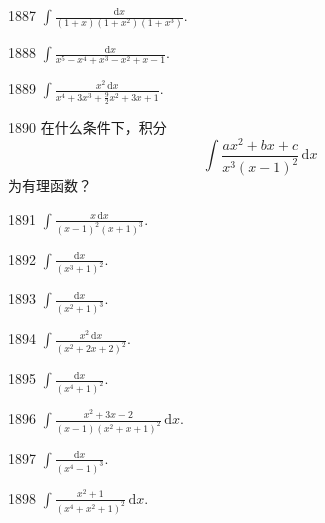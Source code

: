 \begin{prob}[S]{1887}
$\int \frac{\mathrm{d}x}{(1 + x)(1 + x^2)(1 + x^3)}$.
\end{prob}

\begin{prob}[S]{1888}
$\int \frac{\mathrm{d}x}{x^5 - x^4 + x^3 - x^2 + x - 1}$.
\end{prob}

\begin{prob}[S]{1889}
$\int \frac{x^2\,\mathrm{d}x}{x^4 + 3x^3 + \frac{9}{2}x^2 + 3x + 1}$.
\end{prob}

\begin{prob}[M]{1890}
在什么条件下，积分
\[
\int \frac{ax^2 + bx + c}{x^3(x - 1)^2}\,\mathrm{d}x
\]
为有理函数？
\end{prob}


\begin{prob}[S]{1891}
$\displaystyle \int \frac{x\,\mathrm{d}x}{(x - 1)^2(x + 1)^3}$.
\end{prob}

\begin{prob}[S]{1892}
$\displaystyle \int \frac{\mathrm{d}x}{(x^3 + 1)^2}$.
\end{prob}

\begin{prob}[S]{1893}
$\displaystyle \int \frac{\mathrm{d}x}{(x^2 + 1)^3}$.
\end{prob}

\begin{prob}[S]{1894}
$\displaystyle \int \frac{x^2\,\mathrm{d}x}{(x^2 + 2x + 2)^2}$.
\end{prob}

\begin{prob}[S]{1895}
$\displaystyle \int \frac{\mathrm{d}x}{(x^4 + 1)^2}$.
\end{prob}

\begin{prob}[S]{1896}
$\displaystyle \int \frac{x^2 + 3x - 2}{(x - 1)(x^2 + x + 1)^2}\,\mathrm{d}x$.
\end{prob}

\begin{prob}[S]{1897}
$\displaystyle \int \frac{\mathrm{d}x}{(x^4 - 1)^3}$.
\end{prob}


\begin{prob}[S]{1898}
$\displaystyle \int \frac{x^2 + 1}{(x^4 + x^2 + 1)^2}\,\mathrm{d}x$.
\end{prob}


